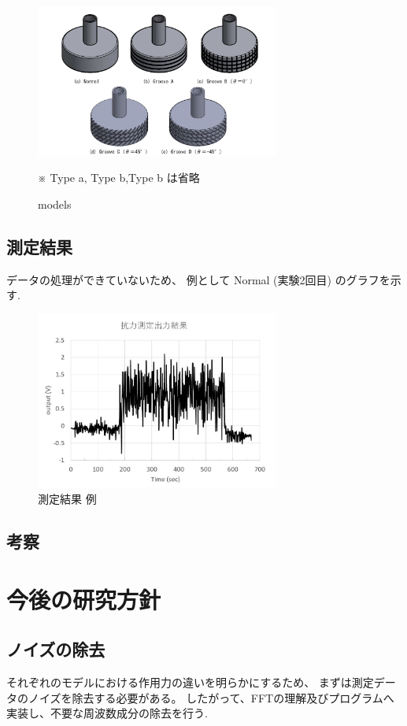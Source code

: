 \documentclass[twocolumn,a4j]{jsarticle}
\begin{document}
\begin{figure}[htbp]
    \footnotesize
    \begin{center}
        \includegraphics[width=80mm]{images/models_1.jpg}
        \caption{models}
        ※ Type a, Type b,Type b は省略
    \end{center}
\end{figure}
\subsection{測定結果}
データの処理ができていないため、
例として Normal (実験2回目) のグラフを示す.
\begin{figure}[htbp]
    \begin{center}
        \includegraphics[width=80mm]{images/graph.jpg}
        \caption{測定結果 例}
    \end{center}
\end{figure}
\subsection{考察}
\section{今後の研究方針}
\subsection{ノイズの除去}
それぞれのモデルにおける作用力の違いを明らかにするため、
まずは測定データのノイズを除去する必要がある。
したがって、FFTの理解及びプログラムへ実装し、不要な周波数成分の除去を行う.\\
\end{document}
